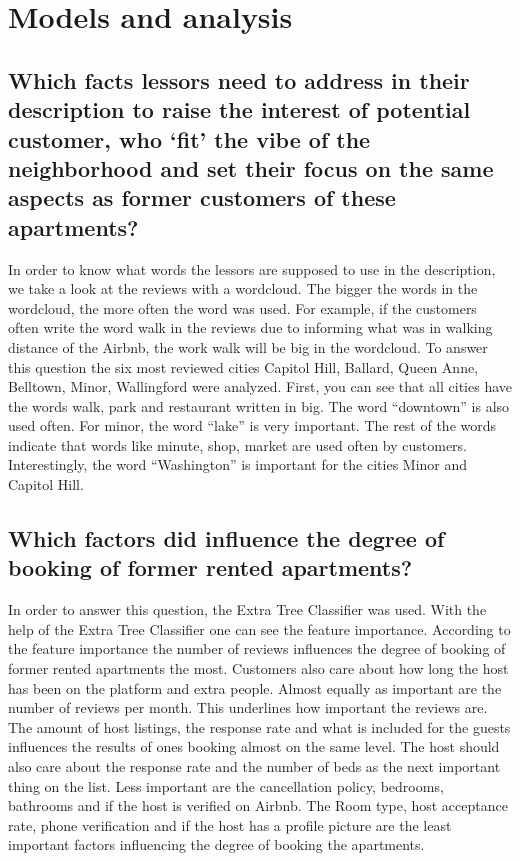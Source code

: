 \section{Models and analysis}
\subsection{Which facts lessors need to address in their description to raise the interest of potential customer, who ‘fit’ the vibe of the neighborhood and set their focus on the same aspects as former customers of these apartments?}
In order to know what words the lessors are supposed to use in the description, we take a look at the reviews with a wordcloud. The bigger the words in the wordcloud, the more often the word was used. For example, if the customers often write the word walk in the reviews due to informing what was in walking distance of the Airbnb, the work walk will be big in the wordcloud. 
To answer this question the six most reviewed cities Capitol Hill, Ballard, Queen Anne, Belltown, Minor, Wallingford were analyzed. First, you can see that all cities have the words walk, park and restaurant written in big. The word “downtown” is also used often. For minor, the word “lake” is very important. The rest of the words indicate that words like minute, shop, market are used often by customers. Interestingly, the word “Washington” is important for the cities Minor and Capitol Hill.
\subsection{Which factors did influence the degree of booking of former rented apartments? }
In order to answer this question, the Extra Tree Classifier was used. With the help of the Extra Tree Classifier one can see the feature importance. According to the feature importance the number of reviews influences the degree of booking of former rented apartments the most. Customers also care about how long the host has been on the platform and extra people. Almost equally as important are the number of reviews per month. This underlines how important the reviews are. The amount of host listings, the response rate and what is included for the guests influences the results of ones booking almost on the same level. The host should also care about the response rate and the number of beds as the next important thing on the list. Less important are the cancellation policy, bedrooms, bathrooms and if the host is verified on Airbnb. The Room type, host acceptance rate, phone verification and if the host has a profile picture are the least important factors influencing the degree of booking the apartments.
